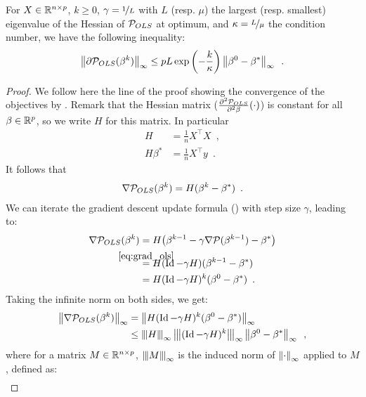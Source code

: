 \documentclass[../main.tex]{subfiles}
\begin{document}
\begin{proposition}\label{prop:ls_kkt}
    For $X\in\mathbb{R}^{n\times p}$, $k\geq 0$, $\gamma = \nicefrac{1}{L}$
    with $L$ (resp. $\mu$) the largest (resp. smallest) eigenvalue of
    the Hessian of $\mathcal{P}_{OLS}$ at optimum, and $\kappa=\nicefrac{L}{\mu}$ the condition
    number, we have the following inequality:
    \begin{align}
    \left \lVert \partial\mathcal{P}_{OLS}(\beta^k) \right \rVert_{\infty}
    \leq pL \exp\left(-\frac{k}{\kappa}\right) \left \lVert \beta^0 - \beta^* \right \rVert_\infty
    \enspace.
    \end{align}
\end{proposition}
\begin{proof}
We follow here the line of the proof showing the convergence of the objectives by \citep{Bachbook}.
Remark that the Hessian matrix ($\frac{\partial^2{\mathcal{P}_{OLS}}}{\partial^2 \beta}(\cdot)$)
is constant for all $\beta\in \mathbb{R}^p$, so we write $H$ for this matrix.
In particular
\begin{align}
    H & = \frac{1}{n}X^\top X\enspace, \\
    H\beta^* & = \frac{1}{n}X^\top y \enspace.
\end{align}
It follows that
\begin{align}\label{eq:grad_ols}
\nabla \mathcal{P}_{OLS}(\beta^k) = H(\beta^k - \beta^*) \enspace.
\end{align}
We can iterate the gradient descent update formula () with step size $\gamma$,
leading to:
\begin{align*}
    \nabla \cP_{OLS}(\beta^k)
     & = H\big(\beta^{k-1} - \gamma \nabla \cP(\beta^{k-1}) - \beta^*\big) \\
     & \stackrel{\mathmakebox[\widthof{=}]{{\ref{eq:grad_ols}}}}{=}  H(\Id - \gamma H) (\beta^{k-1} - \beta^*) \\
     & = H(\Id - \gamma H)^k (\beta^0 - \beta^*) \enspace.
\end{align*}
%
Taking the infinite norm on both sides, we get:
\begin{align*}
    \norm{\nabla \cP_{OLS}(\beta^k)}_\infty
    & = \norm{H(\Id - \gamma H)^k (\beta^0 - \beta^*)}_\infty \\
    & \leq \tnorm{H}_\infty \tnorm{(\Id - \gamma H)^k}_\infty \norm{\beta^0 - \beta^*}_\infty \enspace,
\end{align*}
where for a matrix $M\in\mathbb{R}^{n\times p}$, $\tnorm{M}_\infty$ is the induced norm
of $\left \lVert \cdot \right \rVert_\infty$ applied to $M$, defined as:
\begin{align*}

\end{align*}
\end{proof}
\end{document}
